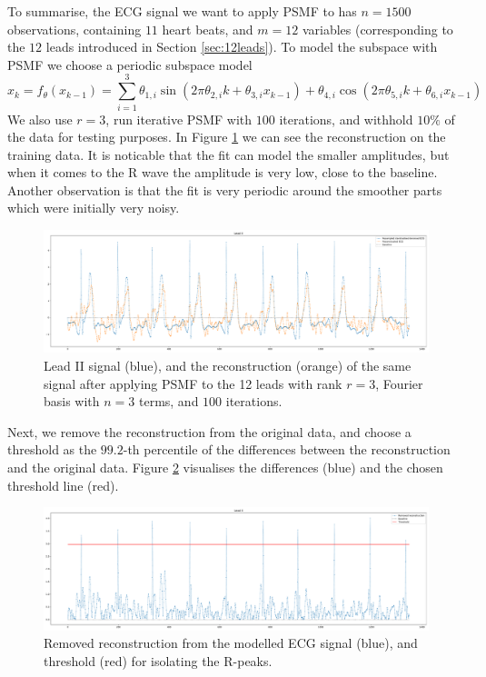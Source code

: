 \documentclass{mldsmsc}
\begin{document}
To summarise, the ECG signal we want to apply PSMF to has $n = 1500$ observations, containing $11$ heart beats, and $m = 12$ variables (corresponding to the $12$ leads introduced in Section \ref{sec:12leads}). To model the subspace with PSMF we choose a periodic subspace model
\begin{equation}
    x_k = f_{\theta}(x_{k-1}) = \sum_{i=1}^3 \theta_{1,i} \sin(2\pi \theta_{2,i} k + \theta_{3,i} x_{k-1}) + \theta_{4,i} \cos(2\pi \theta_{5,i} k + \theta_{6,i} x_{k-1})
\end{equation}
We also use $r = 3$, run iterative PSMF with $100$ iterations, and withhold $10\%$ of the data for testing purposes. In Figure \ref{fig:reconstr-ecg} we can see the reconstruction on the training data. It is noticable that the fit can model the smaller amplitudes, but when it comes to the R wave the amplitude is very low, close to the baseline. Another observation is that the fit is very periodic around the smoother parts which were initially very noisy.

\begin{figure}[H]
\centering
\includegraphics[width=1\linewidth]{images/r_peaks/resampled_standardised_denoised_ecg_reconstruction_m.pdf}
\caption{Lead II signal (blue), and the reconstruction (orange) of the same signal after applying PSMF to the 12 leads with rank $r = 3$, Fourier basis with $n = 3$ terms, and $100$ iterations.}
\label{fig:reconstr-ecg}
\end{figure}

\noindent Next, we remove the reconstruction from the original data, and choose a threshold as the $99.2$-th percentile of the differences between the reconstruction and the original data. Figure \ref{fig:diff-ecg} visualises the differences (blue) and the chosen threshold line (red).

\begin{figure}[H]
\centering
\includegraphics[width=1\linewidth]{images/r_peaks/resampled_standardised_denoised_ecg_rpeaks_algo_m.pdf}
\caption{Removed reconstruction from the modelled ECG signal (blue), and threshold (red) for isolating the R-peaks.}
\label{fig:diff-ecg}
\end{figure}
\end{document}
